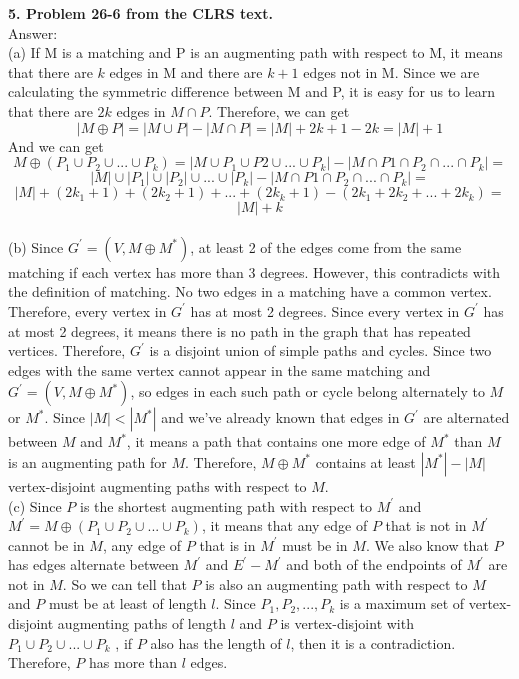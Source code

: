 \documentclass{article}
\begin{document}
\noindent
\textbf{5. Problem 26-6 from the CLRS text.} \\
\noindent
Answer: \\
(a) If M is a matching and P is an augmenting path with respect to M, it means that there are $k$ edges in M and there are $k + 1$ edges not in M. Since we are calculating the symmetric difference between M and P, it is easy for us to learn that there are $2k$ edges in $M\cap P$. Therefore, we can get $$|M \oplus P| = |M\cup P| - |M\cap P| = |M| + 2k + 1 - 2k = |M| + 1$$ And we can get $$M \oplus (P_1\cup P_2 \cup ... \cup P_k )  = |M\cup P_1\cup P2\cup ... \cup P_k| - |M\cap P1\cap P_2\cap ... \cap P_k| = $$ $$|M|\cup |P_1|\cup |P_2|\cup ... \cup |P_k| -  |M\cap P1\cap P_2\cap ... \cap P_k| = $$ $$|M| + (2k_1 + 1) + (2k_2 + 1) + ... + (2k_k + 1) - (2k_1 + 2k_2 + ... + 2k_k) = $$ $$|M| + k$$ \\
(b) Since $G^{'} = (V, M\oplus M^{*})$, at least 2 of the edges come from the same matching if each vertex has more than 3 degrees. However, this contradicts with the definition of matching. No two edges in a matching have a common vertex. Therefore, every vertex in $G^{'}$ has at most 2 degrees. Since every vertex in $G^{'}$ has at most 2 degrees, it means there is no path in the graph that has repeated vertices. Therefore, $G^{'}$ is a disjoint union of simple paths and cycles. Since two edges with the same vertex cannot appear in the same matching and $G^{'} = (V, M\oplus M^{*})$, so edges in each such path or cycle belong alternately to $M$ or $M^{*}$. Since $|M| < |M^{*}|$ and we've already known that edges in $G^{'}$ are alternated between $M$ and $M^{*}$, it means a path that contains one more edge of $M^{*}$ than $M$ is an augmenting path for $M$. Therefore, $M\oplus M^{*}$ contains at least $|M^{*}| - |M|$ vertex-disjoint augmenting paths with respect to $M$.\\ \newline
(c) Since $P$ is the shortest augmenting path with respect to $M^{'}$ and $M^{'} = M\oplus (P_1\cup P_2\cup ... \cup P_k)$, it means that any edge of $P$ that is not in $M^{'}$ cannot be in $M$, any edge of $P$ that is in $M^{'}$ must be in $M$. We also know that $P$ has edges alternate between $M^{'}$ and $E^{'} - M^{'}$ and both of the endpoints of $M^{'}$ are not in $M$. So we can tell that $P$ is also an augmenting path with respect to $M$ and $P$ must be at least of length $l$. Since $P_1, P_2, ... ,P_k$ is a maximum set of vertex-disjoint augmenting paths of length $l$ and $P$ is vertex-disjoint with $P_1\cup P_2\cup ... \cup P_k$ , if $P$ also has the length of $l$, then it is a contradiction. Therefore, $P$ has more than $l$ edges. \\ \newline
\end{document}
